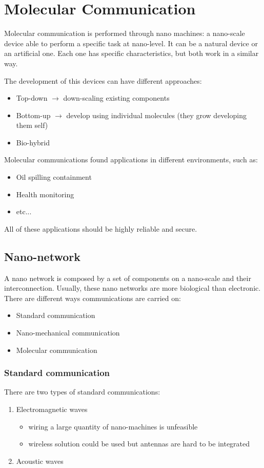 \chapter{Molecular Communication}

Molecular communication is performed through nano machines: a nano-scale device
able to perform a specific task at nano-level.
It can be a natural device or an artificial one. Each one has specific
characteristics, but both work in a similar way.

The development of this devices can have different approaches:
\begin{itemize}
\item Top-down $\to$ down-scaling existing components
\item Bottom-up $\to$ develop using individual molecules (they grow developing
  them self)
\item Bio-hybrid
\end{itemize}

Molecular communications found applications in different environments, such as:
\begin{itemize}
\item Oil spilling containment
\item Health monitoring
\item etc...
\end{itemize}
All of these applications should be highly reliable and secure.

\section{Nano-network}

A nano network is composed by a set of components on a nano-scale and their
interconnection. Usually, these nano networks are more biological than
electronic.
There are different ways communications are carried on:
\begin{itemize}
\item Standard communication
\item Nano-mechanical communication
\item Molecular communication
\end{itemize}

\subsection{Standard communication}

There are two types of standard communications:
\begin{enumerate}
\item Electromagnetic waves
  \begin{itemize}
  \item wiring a large quantity of nano-machines is unfeasible
  \item wireless solution could be used but antennas are hard to be integrated
  \end{itemize}
\item Acoustic waves
\end{enumerate}


